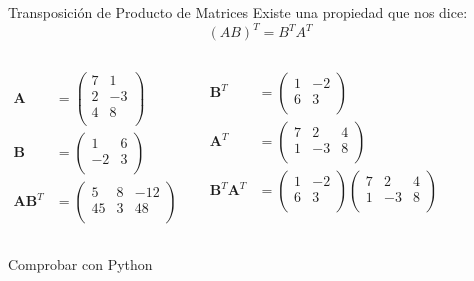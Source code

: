 \begin{frame}{Transposición de Producto de Matrices}
  Existe una propiedad que nos dice: \[ (AB)^{T} = B^T A^T \]

  \begin{columns}
  \begin{align*}
    \bm{A} & =%
             \begin{pmatrix}
               7&  1\\ 
               2& -3\\ 
               4&  8\\
             \end{pmatrix}
    \\
    \bm{B} &=%
             \begin{pmatrix}
               1& 6 \\
               -2& 3 \\
             \end{pmatrix}
    \\
    \bm{AB}^T &= %
                \begin{pmatrix}
                  5 &  8& -12\\
                  45&   3&  48\\
                \end{pmatrix}
  \end{align*}
  
  \begin{align*}
    \bm{B}^T &=%
               \begin{pmatrix}
                 1& -2 \\
                 6& 3 \\
               \end{pmatrix}
    \\
       \bm{A}^T & =%
             \begin{pmatrix}
               7&  2& 4 \\ 
               1& -3& 8 \\ 
             \end{pmatrix}
    \\
    \bm{B}^T\bm{A}^T &= %
                       \begin{pmatrix}
                         1& -2 \\
                         6& 3 \\
                       \end{pmatrix}
    \begin{pmatrix}
      7&  2& 4 \\ 
      1& -3& 8 \\ 
    \end{pmatrix}
  \end{align*}
  \end{columns}
Comprobar con Python
\end{frame}


